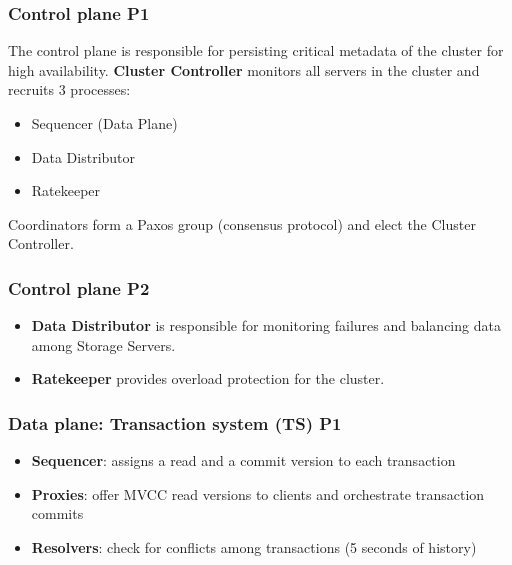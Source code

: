 
\begin{frame}
	\frametitle{Control plane P1}

The control plane is responsible for persisting critical metadata of the cluster for high availability.
\textbf{Cluster Controller} monitors all servers in the cluster and recruits 3 processes:
\begin{itemize}
    \item Sequencer (Data Plane)
    \item Data Distributor
    \item Ratekeeper
\end{itemize}

Coordinators form a Paxos group (consensus protocol) and elect the Cluster Controller.
\end{frame}



\begin{frame}
    \frametitle{Control plane P2}
    
\begin{itemize}
\item \textbf{Data Distributor} is responsible for monitoring failures and balancing data among Storage Servers.
\item \textbf{Ratekeeper} provides overload protection for the cluster.
\end{itemize}
	
\end{frame}


\begin{frame}
	\frametitle{Data plane: Transaction system (TS) P1}
 
\begin{itemize}
    \item \textbf{Sequencer}: assigns a read and a commit version to each transaction
    \item \textbf{Proxies}: offer MVCC read versions to clients and orchestrate transaction commits
    \item \textbf{Resolvers}: check for conflicts among transactions (5 seconds of history)
\end{itemize}
	
\end{frame}


